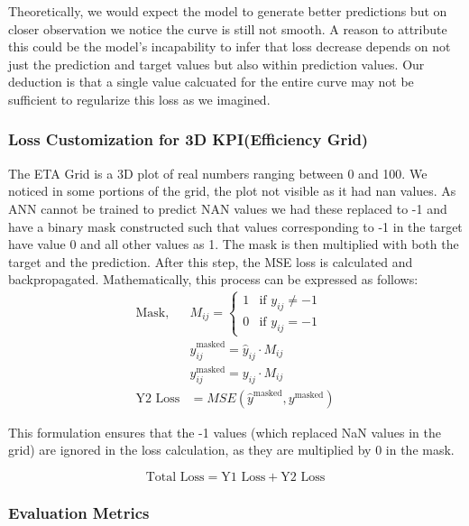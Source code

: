 \documentclass{report} %
\begin{document}
Theoretically, we would expect the model to generate better predictions but on closer observation we notice the curve is still not smooth.
A reason to attribute this could be the model's incapability to infer that loss decrease depends on not just the prediction and target values but also within prediction values.
Our deduction is that a single value calcuated for the entire curve may not be sufficient to regularize this loss as we imagined.

\subsubsection*{Loss Customization for 3D KPI(Efficiency Grid)}
The ETA Grid is a 3D plot of real numbers ranging between 0 and 100. We noticed in some portions of the grid, the plot not visible as it had nan values.
As ANN cannot be trained to predict NAN values we had these replaced to -1 and have a binary mask constructed such that values corresponding to -1 in the target have value 0 and all other values as 1.
The mask is then multiplied with both the target and the prediction. After this step, the MSE loss is calculated and backpropagated.
Mathematically, this process can be expressed as follows:
\begin{equation*}
\begin{aligned}
\text{Mask, } & M_{ij} = \begin{cases}
1 & \text{if } y_{ij} \neq -1 \\
0 & \text{if } y_{ij} = -1
\end{cases} \\
& \hat{y}_{ij}^{\text{masked}} = \hat{y}_{ij} \cdot M_{ij} \\
& y_{ij}^{\text{masked}} = y_{ij} \cdot M_{ij} \\
\text{{Y2 Loss}} & = MSE(\hat{y}^{\text{masked}}, y^{\text{masked}})
\end{aligned}
\end{equation*}


This formulation ensures that the -1 values (which replaced NaN values in the grid) are ignored in the loss calculation, as they are multiplied by 0 in the mask.

\[
\text{Total Loss} = \text{Y1 Loss} + \text{Y2 Loss}
\]

\subsubsection*{Evaluation Metrics}
\end{document}
